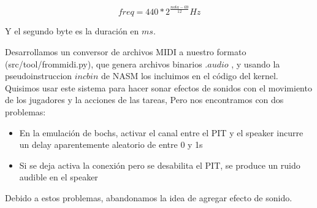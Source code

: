 $$ freq = 440 * 2^{\frac{nota - 69}{12}} Hz $$

Y el segundo byte es la duración en $ms$.

Desarrollamos un conversor de archivos MIDI a nuestro formato (src/tool/frommidi.py),
que genera archivos binarios $.audio$ , y usando la pseudoinstruccion $incbin$ de NASM
los incluimos en el código del kernel.
\\

Quisimos usar este sistema para hacer sonar efectos de sonidos con el movimiento de los jugadores y la acciones de las tareas, Pero nos encontramos con dos problemas:

\begin{itemize}
    \item En la emulación de bochs, activar el canal entre el PIT y el speaker incurre un delay aparentemente aleatorio de entre 0 y 1s
    \item Si se deja activa la conexión pero se desabilita el PIT, se produce un ruido audible en el speaker
\end{itemize}

Debido a estos problemas, abandonamos la idea de agregar efecto de sonido.

